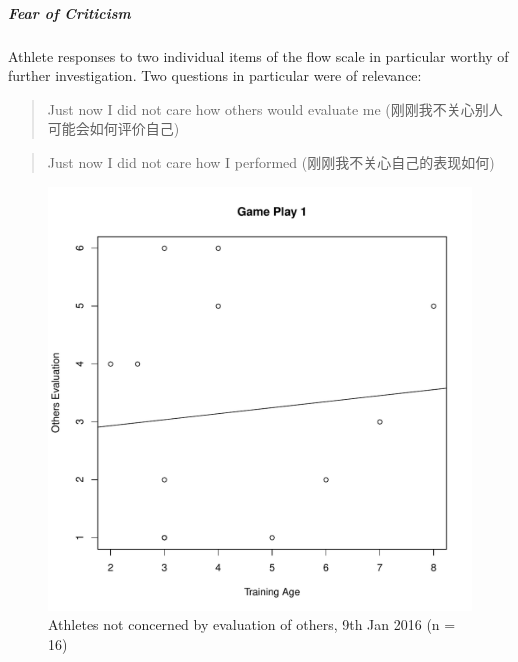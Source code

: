 \begin{CJK}{UTF8}{gbsn}
\subparagraph{Fear of Criticism}

Athlete responses to two individual items of the flow scale in particular  worthy of further investigation.  Two questions in particular were of relevance:

\begin{quotation}
  Just now I did not care how others would evaluate me
  (刚刚我不关心别人可能会如何评价自己)
\end{quotation}

\begin{quotation}
  Just now I did not care how I performed
  (刚刚我不关心自己的表现如何)
\end{quotation}





\begin{figure}[htbp]
  \centering
\includegraphics[scale=.5]{images/othersEval0109TrainingAge.pdf}
  \caption{Athletes not concerned by evaluation of others, 9th Jan 2016 (n = 16)}
  \label{fig:othersEval0109TrainingAge}
\end{figure}


\end{CJK}
